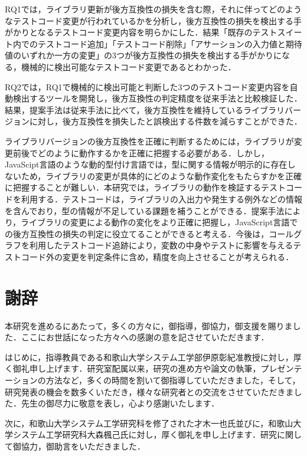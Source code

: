 \documentclass[11pt,dvipdfmx]{jreport}
\begin{document}
RQ1では，ライブラリ更新が後方互換性の損失を含む際，それに伴ってどのようなテストコード変更が行われているかを分析し，後方互換性の損失を検出する手がかりとなるテストコード変更内容を明らかにした．結果「既存のテストスイート内でのテストコード追加」「テストコード削除」「アサーションの入力値と期待値のいずれか一方の変更」の3つが後方互換性の損失を検出する手がかりになる，機械的に検出可能なテストコード変更であるとわかった．

RQ2では，RQ1で機械的に検出可能と判断した3つのテストコード変更内容を自動検出するツールを開発し，後方互換性の判定精度を従来手法と比較検証した．結果，提案手法は従来手法に比べて，後方互換性を維持しているライブラリバージョンに対し，後方互換性を損失したと誤検出する件数を減らすことができた．

ライブラリバージョンの後方互換性を正確に判断するためには，ライブラリが変更前後でどのように動作するかを正確に把握する必要がある．しかし，JavaScipt言語のような動的型付け言語では，型に関する情報が明示的に存在しないため，ライブラリの変更が具体的にどのような動作変化をもたらすかを正確に把握することが難しい．本研究では，ライブラリの動作を検証するテストコードを利用する．テストコードは，ライブラリの入出力や発生する例外などの情報を含んでおり，型の情報が不足している課題を補うことができる．提案手法により，ライブラリの変更による動作の変化をより正確に把握し，JavaScript言語での後方互換性の損失の判定に役立てることができると考える．今後は，コールグラフを利用したテストコード追跡により，変数の中身やテストに影響を与えるテストコード外の変更を判定条件に含め，精度を向上させることが考えられる．

\chapter*{謝辞}

本研究を進めるにあたって，多くの方々に，御指導，御協力，御支援を賜りました．ここにお世話になった方々への感謝の意を記させていただきます．

はじめに，指導教員である和歌山大学システム工学部伊原彰紀准教授に対し，厚く御礼申し上げます．研究室配属以来，研究の進め方や論文の執筆，プレゼンテーションの方法など，多くの時間を割いて御指導していただきました，そして，研究発表の機会を数多くいただき，様々な研究者との交流をさせていただきました．先生の御尽力に敬意を表し，心より感謝いたします．

次に，和歌山大学システム工学研究科を修了された才木一也氏並びに，和歌山大学システム工学研究科大森楓己氏に対し，厚く御礼を申し上げます．研究に関して御協力，御助言をいただきました．
\end{document}
